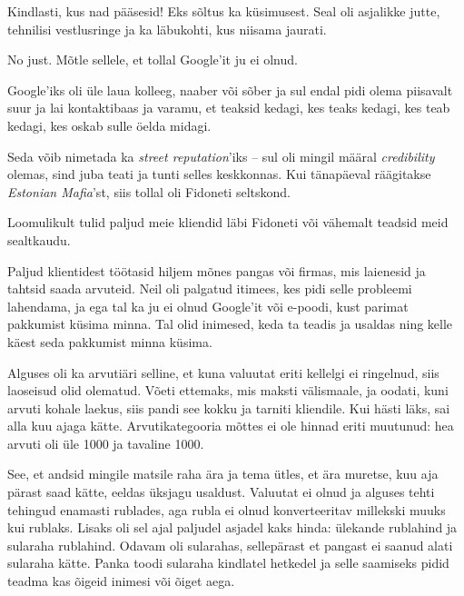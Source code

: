 
Kindlasti, kus nad pääsesid! Eks sõltus ka küsimusest. Seal oli asjalikke 
jutte, tehnilisi vestlusringe ja ka läbukohti, kus niisama jaurati.


No just. Mõtle sellele, et tollal Google'it ju ei olnud.

Google'iks oli üle laua kolleeg, naaber või sõber ja sul endal pidi olema 
piisavalt suur ja lai kontaktibaas ja varamu, et teaksid kedagi, kes 
teaks kedagi, kes teab kedagi, kes oskab sulle öelda midagi.


Seda võib nimetada ka \emph{street reputation}'iks – sul oli mingil määral
\emph{credibility} olemas, sind juba teati ja tunti selles 
keskkonnas. Kui tänapäeval räägitakse \emph{Estonian Mafia}'st, siis tollal 
oli Fidoneti seltskond.

Loomulikult tulid paljud meie kliendid läbi Fidoneti või vähemalt teadsid 
meid sealtkaudu.

Paljud klientidest töötasid hiljem mõnes pangas või firmas, mis
laienesid ja tahtsid saada arvuteid. Neil oli palgatud itimees, 
kes pidi selle probleemi lahendama, ja ega tal ka ju ei olnud Google'it või 
e-poodi, kust parimat pakkumist küsima minna. Tal olid inimesed, keda 
ta teadis ja usaldas ning kelle käest seda pakkumist minna küsima.


Alguses oli ka arvutiäri selline, et kuna valuutat 
eriti kellelgi ei ringelnud, siis laoseisud olid olematud. 
Võeti ettemaks, mis maksti välismaale, ja oodati, 
kuni arvuti kohale laekus, siis pandi see kokku ja tarniti kliendile. Kui hästi 
läks, sai alla kuu ajaga kätte. Arvutikategooria mõttes ei ole
hinnad eriti muutunud: hea arvuti oli üle 1000 ja tavaline 1000.

See, et andsid mingile matsile raha ära ja tema ütles, et ära 
muretse, kuu aja pärast saad kätte, eeldas üksjagu usaldust. Valuutat 
ei olnud ja alguses tehti tehingud enamasti rublades, aga rubla ei olnud 
konverteeritav millekski muuks kui rublaks. Lisaks oli sel ajal paljudel 
asjadel kaks hinda: ülekande rublahind ja sularaha rublahind. Odavam oli 
sularahas, sellepärast et pangast ei saanud alati sularaha kätte. Panka toodi sularaha kindlatel hetkedel ja selle saamiseks pidid teadma kas 
õigeid inimesi või õiget aega.

